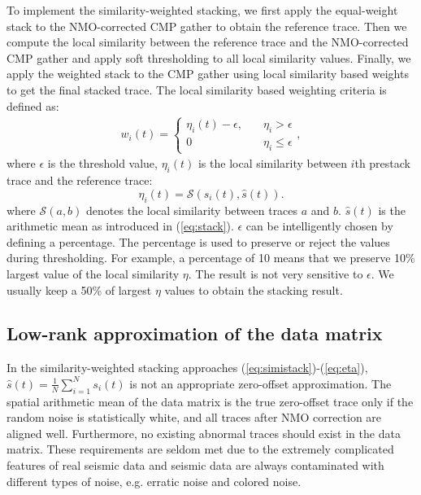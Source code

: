 To implement the similarity-weighted stacking, we first apply the equal-weight stack to the NMO-corrected CMP gather to obtain the reference trace. Then we compute the local similarity \cite[]{yangkang2015orthogroll} between the reference trace and the NMO-corrected CMP gather and apply soft thresholding \cite[]{donoho1995} to all local similarity values. Finally, we apply the weighted stack to the CMP gather using local similarity based weights to get the final stacked trace. %
The local similarity based weighting criteria is defined as:
\begin{align}
\label{eq:weight}
w_i(t)=\left\{\begin{array}{cl}
\eta_{i}(t)-\epsilon, & \quad \eta_i>\epsilon \\
0 & \quad  \eta_i \le \epsilon
\end{array},\right.
\end{align}
where $\epsilon$ is the threshold value, $\eta_i(t)$ is the local similarity between $i$th prestack trace and the reference trace:
\begin{equation}
\label{eq:eta}
\eta_i(t) = \mathcal{S}(s_i(t),\hat{s}(t)).
\end{equation}
where $\mathcal{S}(a,b)$ denotes the local similarity between traces $a$ and $b$. $\hat{s}(t)$ is the arithmetic mean as introduced in (\ref{eq:stack}). $\epsilon$ can be intelligently chosen by defining a percentage. The percentage is used to preserve or reject the values during thresholding. For example, a percentage of 10 means that we preserve 10\% largest value of the local similarity $\eta$. The result is not very sensitive to $\epsilon$. We usually keep a 50\% of largest $\eta$ values to obtain the stacking result.

\subsection{Low-rank approximation of the data matrix}
In the similarity-weighted stacking approaches (\ref{eq:simistack})-(\ref{eq:eta}), $\hat{s}(t)= \frac{1}{N}\sum_{i=1}^{N} s_i(t)$ is not an appropriate zero-offset approximation. The spatial arithmetic mean of the data matrix is the true zero-offset trace only if the random noise is statistically white, and all traces after NMO correction are aligned well. Furthermore, no existing abnormal traces should exist in the data matrix. These requirements are seldom met due to the extremely complicated features of real seismic data and seismic data are always contaminated with different types of noise, e.g. erratic noise and colored noise.

